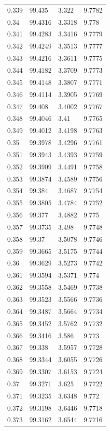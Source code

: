 \begin{tabular}{llll}
0.339 & 99.435 & 3.322 & 9.7782 \\
0.34 & 99.4316 & 3.3318 & 9.778 \\
0.341 & 99.4283 & 3.3416 & 9.7779 \\
0.342 & 99.4249 & 3.3513 & 9.7777 \\
0.343 & 99.4216 & 3.3611 & 9.7775 \\
0.344 & 99.4182 & 3.3709 & 9.7773 \\
0.345 & 99.4148 & 3.3807 & 9.7771 \\
0.346 & 99.4114 & 3.3905 & 9.7769 \\
0.347 & 99.408 & 3.4002 & 9.7767 \\
0.348 & 99.4046 & 3.41 & 9.7765 \\
0.349 & 99.4012 & 3.4198 & 9.7763 \\
0.35 & 99.3978 & 3.4296 & 9.7761 \\
0.351 & 99.3943 & 3.4393 & 9.7759 \\
0.352 & 99.3909 & 3.4491 & 9.7758 \\
0.353 & 99.3874 & 3.4589 & 9.7756 \\
0.354 & 99.384 & 3.4687 & 9.7754 \\
0.355 & 99.3805 & 3.4784 & 9.7752 \\
0.356 & 99.377 & 3.4882 & 9.775 \\
0.357 & 99.3735 & 3.498 & 9.7748 \\
0.358 & 99.37 & 3.5078 & 9.7746 \\
0.359 & 99.3665 & 3.5175 & 9.7744 \\
0.36 & 99.3629 & 3.5273 & 9.7742 \\
0.361 & 99.3594 & 3.5371 & 9.774 \\
0.362 & 99.3558 & 3.5469 & 9.7738 \\
0.363 & 99.3523 & 3.5566 & 9.7736 \\
0.364 & 99.3487 & 3.5664 & 9.7734 \\
0.365 & 99.3452 & 3.5762 & 9.7732 \\
0.366 & 99.3416 & 3.586 & 9.773 \\
0.367 & 99.338 & 3.5957 & 9.7728 \\
0.368 & 99.3344 & 3.6055 & 9.7726 \\
0.369 & 99.3307 & 3.6153 & 9.7724 \\
0.37 & 99.3271 & 3.625 & 9.7722 \\
0.371 & 99.3235 & 3.6348 & 9.772 \\
0.372 & 99.3198 & 3.6446 & 9.7718 \\
0.373 & 99.3162 & 3.6544 & 9.7716 \\

\end{tabular}
